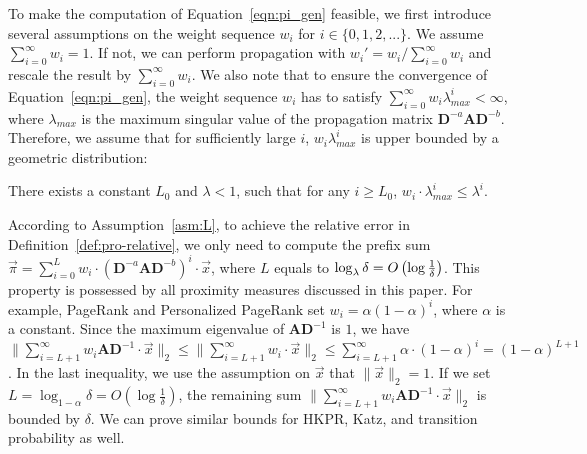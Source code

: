 \vspace{-0.5mm}
 To make the computation of Equation~\eqref{eqn:pi_gen} feasible, we first introduce several assumptions on the weight sequence $w_i$ for $i\in \{0,1,2, ...\}$. We assume $\sum_{i=0}^\infty w_i =1$. If not, we can perform propagation with $w_i' = w_i/\sum_{i=0}^\infty w_i$ and rescale the result by  $\sum_{i=0}^\infty w_i$. We also note that to ensure the convergence of Equation~\ref{eqn:pi_gen}, the weight sequence $w_i$ has to satisfy $\sum_{i=0}^\infty w_i \lambda_{max}^i < \infty$, where $\lambda_{max}$ is the maximum singular value of the propagation matrix $\mathbf{D}^{-a} \mathbf{A}\mathbf{D}^{-b}$. Therefore, we assume that for sufficiently large $i$, $w_i \lambda_{max}^i$ is upper bounded by a geometric distribution: 

\begin{assumption}\label{asm:L}
\vspace{-2mm}
There exists a constant $L_0$ and $\lambda < 1$, such that for any $i \ge L_0$, $w_i \cdot \lambda_{max}^i  \le \lambda^i$.
\end{assumption}
According to Assumption~\ref{asm:L}, to achieve the relative error in Definition~\ref{def:pro-relative}, we only need to compute the prefix sum $\vec{\pi}=\sum_{i=0}^L w_i \cdot \left(\mathbf{D}^{-a}\mathbf{A}\mathbf{D}^{-b} \right)^i \cdot \vec{x}$, where $L$ equals to $ \log_{\lambda} {\delta} = O\left( \log {1 \over \delta}\right)$.
This property is possessed by all proximity measures discussed in this paper. For example, PageRank and Personalized PageRank set $w_i=\alpha \left(1-\alpha\right)^i$, where $\alpha$ is a constant. Since the maximum eigenvalue of $ \mathbf{A}\mathbf{D}^{-1}$ is $1$, we have $\|\sum_{i=L+1}^\infty w_i\mathbf{A}\mathbf{D}^{-1} \cdot \vec{x}\|_2 \le \|\sum_{i=L+1}^\infty w_i\cdot \vec{x}\|_2 \le \sum_{i=L+1}^\infty \alpha \cdot \left(1-\alpha\right)^i =(1-\alpha)^{L+1}$. In the last inequality, we use the assumption on $\vec{x}$ that $\|\vec{x}\|_2=1$. If we set $L=\log_{1-\alpha} \delta=O\left(\log{\frac{1}{\delta}} \right)$, the remaining sum $\|\sum_{i=L+1}^\infty w_i\mathbf{A}\mathbf{D}^{-1} \cdot \vec{x}\|_2$ is bounded  by $\delta$.
We can prove similar bounds for HKPR, Katz, and transition probability as well.


